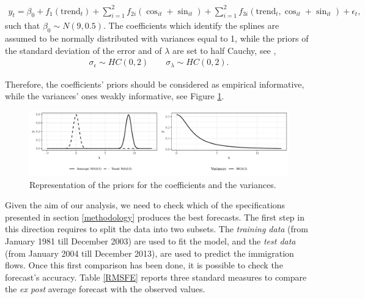 \documentclass{article}\usepackage[]{graphicx}\usepackage[]{color}
\makeatletter
\def\maxwidth{ %
  \ifdim\Gin@nat@width>\linewidth
    \linewidth
  \else
    \Gin@nat@width
  \fi
}
\newenvironment{knitrout}{}{} %
\makeatother
\begin{document}
\begin{align}\label{fourier_2nd_gam}
y_{t}=\beta_{0}+ f_{1}(\text{trend}_{t})+\sum_{i=1}^{2}f_{2i}(\cos_{it}+\sin_{it})+\sum_{i=1}^{2}f_{3i}(\text{trend}_{t}, \cos_{it}+\sin_{it})+\epsilon_{t},
\end{align}
such that $\beta_0 \sim N(9, 0.5)$. The coefficients which identify the splines are assumed to be normally distributed with variances equal to 1, while the priors of the standard deviation of the error and of $\lambda$ are set to half Cauchy, see , 
\begin{align}\label{variance}
\sigma_{\epsilon} \sim HC(0,2) \quad \quad \sigma_{\lambda} \sim HC(0,2).
\end{align}

Therefore, the coefficients' priors should be considered as empirical informative, while the variances' ones weakly informative, see Figure \ref{fig:weak priors}.

\begin{knitrout}
\color{fgcolor}\begin{figure}[!ht]
\includegraphics[width=\maxwidth]{figure/weak_priors-1} \caption[Representation of the priors for the coefficients and the variances]{Representation of the priors for the coefficients and the variances.}\label{fig:weak priors}
\end{figure}


\end{knitrout}

Given the aim of our analysis, we need to check which of the specifications presented in section \ref{methodology} produces the best forecasts. The first step in this direction requires to split the data into two subsets. The \textit{training data} (from January 1981 till December 2003) are used to fit the model, and the \textit{test data} (from January 2004 till December 2013), are used to predict the immigration flows. Once this first comparison has been done, it is possible to check the forecast's accuracy. Table \ref{RMSFE} reports three standard measures to compare the \textit{ex post} average forecast with the observed values.
\end{document}
